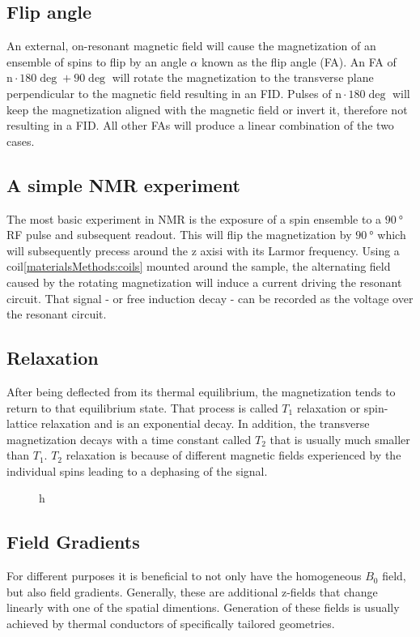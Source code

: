 		\subsection{Flip angle}
			An external, on-resonant magnetic field will cause the magnetization of an ensemble of
			spins to flip by an angle $\alpha$ known as the flip angle (FA). An FA of $\mathrm n\cdot 180
			\deg + 90 \deg$ will rotate the magnetization to the transverse plane perpendicular to the magnetic field
			resulting in an FID. Pulses of $\mathrm n\cdot 180 \deg$ will keep the magnetization aligned
			with the magnetic field or invert it, therefore not resulting in a FID. All other FAs
			will produce a linear combination of the two cases.
		\subsection{A simple NMR experiment}
		The most basic experiment in NMR is the exposure of a spin ensemble to a $\SI{90}{\degree}$
		RF pulse and subsequent readout. This will flip the magnetization by $\SI{90}{\degree}$
		which will subsequently precess around the z axisi with its Larmor frequency. Using a coil\ref{materialsMethods:coils}
		mounted around the sample, the alternating field caused by the rotating magnetization will induce a
		current driving the resonant circuit. That signal - or free induction decay - can be
		recorded as the voltage over the resonant circuit.
		\subsection{Relaxation}
		After being deflected from its thermal equilibrium, the magnetization tends to return to
		that equilibrium state. That process is called $T_1$ relaxation or spin-lattice relaxation
		and is an exponential decay. In addition, the transverse magnetization decays with a time
		constant called $T_2$ that is usually much smaller than $T_1$. $T_2$ relaxation is because
		of different magnetic fields experienced by the individual spins leading to a dephasing of
		the signal.
		\begin{figure}{h}
		\end{figure}
		\subsection{Field Gradients}
		For different purposes it is beneficial to not only have the homogeneous $B_0$ field, but
		also field gradients. Generally, these are additional z-fields that change linearly with one
		of the spatial dimentions. Generation of these fields is usually achieved by thermal
		conductors of specifically tailored geometries.
